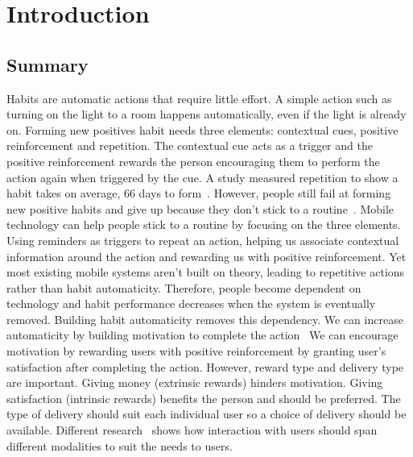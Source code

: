 
\section{Introduction}

\subsection{Summary}

Habits are automatic actions that require little effort. A simple action such as turning on the light to a room happens automatically, even if the light is already on.
Forming new positives habit needs three elements: contextual cues, positive
reinforcement and repetition.
The contextual cue acts as a trigger and the positive reinforcement rewards the
person encouraging them to perform the action again when triggered by the cue.
A study measured repetition to show a habit takes on average,
66 days to form~\cite{article_how_habits_formed_modelling_habit_formation}.
However, people still fail at forming new positive habits and give up because
they don't stick to a
routine~\cite{article_promoting_habit_formation, article_the_habitual_consumer}.\newline
\newline
Mobile technology can help people stick to a routine by focusing on the three elements.
Using reminders as triggers to repeat an action, helping us associate contextual
information around the action and rewarding us with positive reinforcement.
Yet most existing mobile systems aren't built on theory, leading to repetitive actions rather than habit automaticity.
Therefore, people become dependent on technology and habit performance decreases when the system is eventually removed.\newline
\newline
Building habit automaticity removes this dependency.
We can increase automaticity by building motivation to complete the action~\cite{article_a_self_efficacy, article_meta_analytic_review_intrinsic_motivation}
We can encourage motivation by rewarding users with positive reinforcement by granting user's satisfaction after completing the action.
However, reward type and delivery type are important. Giving money (extrinsic rewards) hinders motivation.
Giving satisfaction (intrinsic rewards) benefits the person and should be preferred.
The type of delivery should suit each individual user so a choice of delivery should be available.
Different research~\cite{article_user_centred_multimodal_reminders} shows how interaction with users should span different modalities to suit the needs to users.
